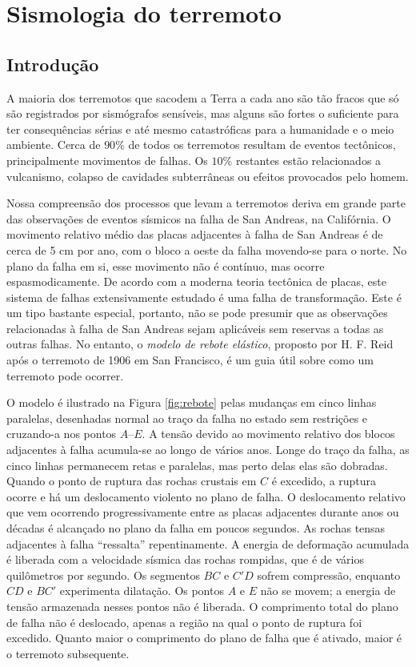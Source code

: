\documentclass[]{book}
\theoremstyle{definition}
\theoremstyle{definition}
\theoremstyle{definition}
\theoremstyle{remark}
\begin{document}
\hypertarget{sismologia-do-terremoto}{%
\section{Sismologia do terremoto}\label{sismologia-do-terremoto}}

\hypertarget{introducao-3}{%
\subsection{Introdução}\label{introducao-3}}

A maioria dos terremotos que sacodem a Terra a cada ano são tão fracos que só são registrados por sismógrafos sensíveis, mas alguns são fortes o suficiente para ter consequências sérias e até mesmo catastróficas para a humanidade e o meio ambiente. Cerca de \(90\%\) de todos os terremotos resultam de eventos tectônicos, principalmente movimentos de falhas. Os \(10\%\) restantes estão relacionados a vulcanismo, colapso de cavidades subterrâneas ou efeitos provocados pelo homem.

Nossa compreensão dos processos que levam a terremotos deriva em grande parte das observações de eventos sísmicos na falha de San Andreas, na Califórnia. O movimento relativo médio das placas adjacentes à falha de San Andreas é de cerca de 5 cm por ano, com o bloco a oeste da falha movendo-se para o norte. No plano da falha em si, esse movimento não é contínuo, mas ocorre espasmodicamente. De acordo com a moderna teoria tectônica de placas, este sistema de falhas extensivamente estudado é uma falha de transformação. Este é um tipo bastante especial, portanto, não se pode presumir que as observações relacionadas à falha de San Andreas sejam aplicáveis sem reservas a todas as outras falhas. No entanto, o \emph{modelo de rebote elástico}, proposto por H. F. Reid após o terremoto de 1906 em San Francisco, é um guia útil sobre como um terremoto pode ocorrer.

O modelo é ilustrado na Figura \ref{fig:rebote} pelas mudanças em cinco linhas paralelas, desenhadas normal ao traço da falha no estado sem restrições e cruzando-a nos pontos \(A–E\). A tensão devido ao movimento relativo dos blocos adjacentes à falha acumula-se ao longo de vários anos. Longe do traço da falha, as cinco linhas permanecem retas e paralelas, mas perto delas elas são dobradas. Quando o ponto de ruptura das rochas crustais em \(C\) é excedido, a ruptura ocorre e há um deslocamento violento no plano de falha. O deslocamento relativo que vem ocorrendo progressivamente entre as placas adjacentes durante anos ou décadas é alcançado no plano da falha em poucos segundos. As rochas tensas adjacentes à falha ``ressalta'' repentinamente. A energia de deformação acumulada é liberada com a velocidade sísmica das rochas rompidas, que é de vários quilômetros por segundo. Os segmentos \(BC\) e \(C'D\) sofrem compressão, enquanto \(CD\) e \(BC'\) experimenta dilatação. Os pontos \(A\) e \(E\) não se movem; a energia de tensão armazenada nesses pontos não é liberada. O comprimento total do plano de falha não é deslocado, apenas a região na qual o ponto de ruptura foi excedido. Quanto maior o comprimento do plano de falha que é ativado, maior é o terremoto subsequente.
\end{document}
